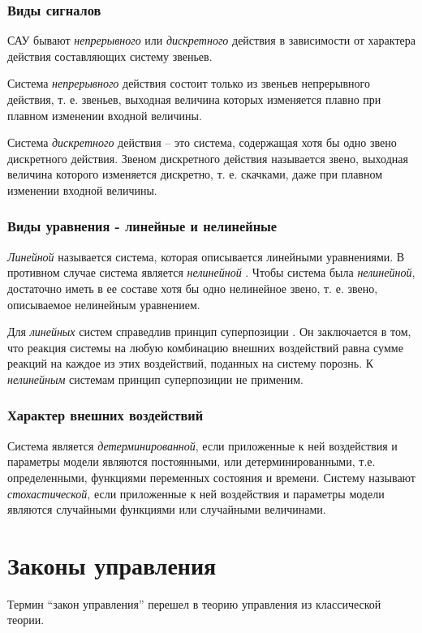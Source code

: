 \documentclass[../../TAU.tex]{subfiles}
\begin{document}
\subsubsection{Виды сигналов}

    САУ бывают {\it непрерывного} или {\it дискретного} действия в зависимости от характера действия составляющих систему звеньев. \par
    Система {\it непрерывного} действия состоит только из звеньев непрерывного действия, т. е. звеньев, выходная величина которых изменяется плавно при плавном изменении входной величины. \par
    Система {\it дискретного}  действия – это система, содержащая хотя бы одно звено дискретного действия. Звеном дискретного действия называется звено, выходная величина которого изменяется дискретно, т. е. скачками, даже при плавном изменении входной величины.

\subsubsection{Виды уравнения - линейные и нелинейные}

    {\it Линейной} называется система, которая описывается линейными уравнениями. В противном случае система является {\it нелинейной} . Чтобы система была {\it нелинейной}, достаточно иметь в ее составе хотя бы одно нелинейное звено, т. е. звено, описываемое нелинейным уравнением. \par
    Для {\it линейных} систем справедлив принцип суперпозиции . Он заключается в том, что реакция системы на любую комбинацию внешних воздействий равна сумме реакций на каждое из этих воздействий, поданных на систему порознь. К {\it нелинейным} системам принцип суперпозиции не применим. 


\subsubsection{Характер внешних воздействий}

    Система является {\it детерминированной}, если приложенные к ней воздействия и параметры модели являются постоянными, или детерминированными, т.е. определенными, функциями переменных состояния и времени. Систему называют {\it стохастической}, если приложенные к ней воздействия и параметры модели являются случайными функциями или случайными величинами.

\section{Законы управления}
    Термин “закон управления” перешел в теорию управления из классической теории. 
\end{document}
